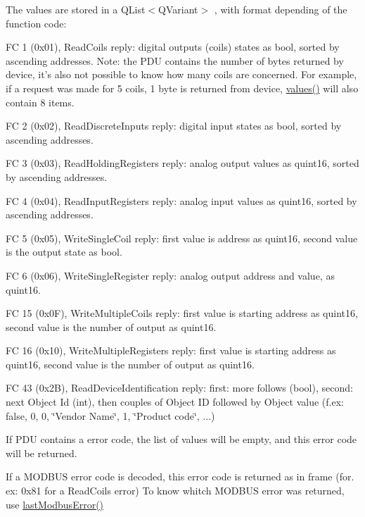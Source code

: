 The values are stored in a Q\-List$<$Q\-Variant$>$ , with format depending of the function code\-:
\begin{DoxyItemize}
\item F\-C 1 (0x01), Read\-Coils reply\-: digital outputs (coils) states as bool, sorted by ascending addresses. Note\-: the P\-D\-U contains the number of bytes returned by device, it's also not possible to know how many coils are concerned. For example, if a request was made for 5 coils, 1 byte is returned from device, \hyperlink{classmdt_frame_codec_af3353b74e1ab64ad7cc764dcaf22e7e8}{values()} will also contain 8 items.
\item F\-C 2 (0x02), Read\-Discrete\-Inputs reply\-: digital input states as bool, sorted by ascending addresses.
\item F\-C 3 (0x03), Read\-Holding\-Registers reply\-: analog output values as quint16, sorted by ascending addresses.
\item F\-C 4 (0x04), Read\-Input\-Registers reply\-: analog input values as quint16, sorted by ascending addresses.
\item F\-C 5 (0x05), Write\-Single\-Coil reply\-: first value is address as quint16, second value is the output state as bool.
\item F\-C 6 (0x06), Write\-Single\-Register reply\-: analog output address and value, as quint16.
\item F\-C 15 (0x0\-F), Write\-Multiple\-Coils reply\-: first value is starting address as quint16, second value is the number of output as quint16.
\item F\-C 16 (0x10), Write\-Multiple\-Registers reply\-: first value is starting address as quint16, second value is the number of output as quint16.
\item F\-C 43 (0x2\-B), Read\-Device\-Identification reply\-: first\-: more follows (bool), second\-: next Object Id (int), then couples of Object I\-D followed by Object value (f.\-ex\-: false, 0, 0, \char`\"{}\-Vendor Name\char`\"{}, 1, \char`\"{}\-Product code\char`\"{}, ...)
\end{DoxyItemize}

If P\-D\-U contains a error code, the list of values will be empty, and this error code will be returned.

If a M\-O\-D\-B\-U\-S error code is decoded, this error code is returned as in frame (for. ex\-: 0x81 for a Read\-Coils error) To know whitch M\-O\-D\-B\-U\-S error was returned, use \hyperlink{classmdt_frame_codec_modbus_a21f3102e12f1a1d9c4145c1ce1f8e6b6}{last\-Modbus\-Error()}


